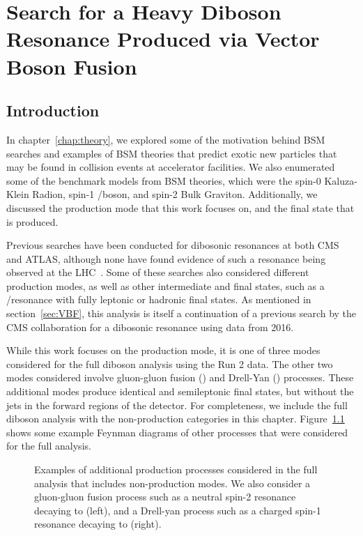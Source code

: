 
\chapter{Search for a Heavy Diboson Resonance Produced via Vector Boson Fusion}
\label{chap:analysis}

\section{Introduction}

In chapter~\ref{chap:theory}, we explored some of the motivation behind BSM searches and examples of BSM theories that predict exotic new particles that may be found in collision events at accelerator facilities.
We also enumerated some of the benchmark models from BSM theories, which were the spin-0 Kaluza-Klein Radion, spin-1 \Wpr/\Zpr boson, and spin-2 Bulk Graviton.
Additionally, we discussed the \VBF production mode that this work focuses on, and the final state that is produced.

Previous searches have been conducted for dibosonic resonances at both CMS and ATLAS, although none have found evidence of such a resonance being observed at the LHC~\cite{Sirunyan_18,Aaboud_18,Aaboud_18_2,Aad_15,Khachatryan_14,Sirunyan_17,Sirunyan_17_2,atlas20}.
Some of these searches also considered different production modes, as well as other intermediate and final states, such as a \ZZ/\ZH resonance with fully leptonic or hadronic final states.
As mentioned in section~\ref{sec:VBF}, this analysis is itself a continuation of a previous search by the CMS collaboration for a dibosonic resonance using data from 2016.

While this work focuses on the \VBF production mode, it is one of three modes considered for the full diboson analysis using the Run 2 data.
The other two modes considered involve gluon-gluon fusion (\ggF) and Drell-Yan (\DY) processes.
These additional modes produce identical \lnuqqbarprp and \lnubbbar semileptonic final states, but without the \VBF jets in the forward regions of the detector.
For completeness, we include the full diboson analysis with the non-\VBF production categories in this chapter.
Figure~\ref{fig:nonVbf} shows some example Feynman diagrams of other processes that were considered for the full analysis.

\begin{figure}[htbp]
  \centering
  
  \caption{
    Examples of additional production processes considered in the full analysis that includes non-\VBF production modes.
    We also consider a gluon-gluon fusion process such as a neutral spin-2 resonance decaying to \WW (left), and a Drell-yan process such as a charged spin-1 resonance decaying to \WH (right).
  }
  \label{fig:nonVbf}
\end{figure}

